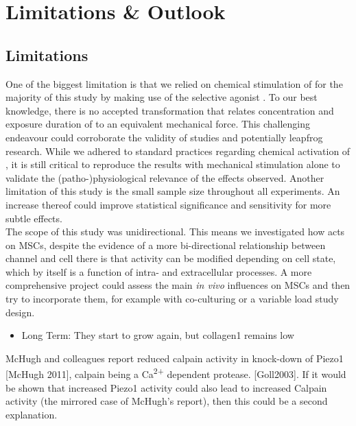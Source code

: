 \chapter{Limitations \& Outlook}

\section{Limitations}
One of the biggest limitation is that we relied on chemical stimulation of \Piezo{} for the majority of this study by making use of the selective \Piezo{} agonist \Yoda{}. To our best knowledge, there is no accepted transformation that relates concentration and exposure duration of \Yoda{} to an equivalent mechanical force. This challenging endeavour could corroborate the validity of \Yoda{} studies and potentially leapfrog \Piezo{} research. While we adhered to standard practices regarding chemical activation of \Piezo{}, it is still critical to reproduce the results with mechanical stimulation alone to validate the (patho-)physiological relevance of the effects observed. 
Another limitation of this study is the small sample size throughout all experiments. An increase thereof could improve statistical significance and sensitivity for more subtle effects.\\
The scope of this study was unidirectional. This means we investigated how \Piezo{} acts on MSCs, despite the evidence of a more bi-directional relationship between channel and cell there is  that \Piezo{} activity can be modified depending on cell state, which by itself is a function of intra- and extracellular processes. A more comprehensive project could assess the main \textit{in vivo} influences on MSCs and then try to incorporate them, for example with co-culturing or a variable load study design.


\begin{itemize}
    \item Long Term: They start to grow again, but collagen1 remains low

\end{itemize}

McHugh and colleagues report reduced calpain activity in knock-down of Piezo1 [McHugh 2011], calpain being a Ca\textsuperscript{2+} dependent protease. [Goll2003]. If it would be shown that increased Piezo1 activity could also lead to increased Calpain activity (the mirrored case of McHugh's report), then this could be a second explanation.
